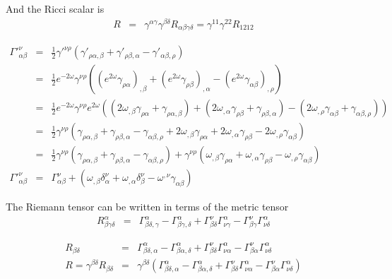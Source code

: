 \documentclass[aps,preprint,preprintnumbers,nofootinbib,showpacs,prd]{revtex4-1}
\newcommand{\nbea}{\begin{eqnarray*}}
\newcommand{\neea}{\end{eqnarray*}}
\begin{document}
And the Ricci scalar is
%
\nbea
R & = & \gamma^{\alpha\gamma} \gamma^{\beta\delta} R_{\alpha\beta\gamma\delta} = \gamma^{11} \gamma^{22} R_{1212}
\neea
%


%
\nbea
\Gamma'^\nu_{\alpha\beta} & = & \frac{1}{2} \gamma'^{\nu\rho} \left ( \gamma'_{\rho\alpha,\beta} + \gamma'_{\rho\beta,\alpha} - \gamma'_{\alpha\beta,\rho} \right ) \\
& = & \frac{1}{2} e^{-2\omega}\gamma^{\nu\rho} \left ( (e^{2\omega}\gamma_{\rho\alpha})_{,\beta} + (e^{2\omega}\gamma_{\rho\beta})_{,\alpha} - (e^{2\omega}\gamma_{\alpha\beta})_{,\rho} \right ) \\
& = & \frac{1}{2} e^{-2\omega}\gamma^{\nu\rho} e^{2\omega} \left ( (2 \omega_{,\beta} \gamma_{\rho\alpha} + \gamma_{\rho\alpha,\beta} ) + (2\omega_{,\alpha}\gamma_{\rho\beta} + \gamma_{\rho\beta,\alpha}) - (2\omega_{,\rho} \gamma_{\alpha\beta} + \gamma_{\alpha\beta,\rho}) \right ) \\
& = & \frac{1}{2} \gamma^{\nu\rho} \left ( \gamma_{\rho\alpha,\beta} + \gamma_{\rho\beta,\alpha} - \gamma_{\alpha\beta,\rho} +  2 \omega_{,\beta} \gamma_{\rho\alpha} + 2\omega_{,\alpha}\gamma_{\rho\beta} - 2\omega_{,\rho} \gamma_{\alpha\beta} \right ) \\
& = & \frac{1}{2} \gamma^{\nu\rho} \left ( \gamma_{\rho\alpha,\beta} + \gamma_{\rho\beta,\alpha} - \gamma_{\alpha\beta,\rho} \right ) + \gamma^{\nu\rho} \left ( \omega_{,\beta} \gamma_{\rho\alpha} + \omega_{,\alpha}\gamma_{\rho\beta} - \omega_{,\rho} \gamma_{\alpha\beta} \right ) \\
\Gamma'^\nu_{\alpha\beta} & = & \Gamma^\nu_{\alpha\beta} + \left ( \omega_{,\beta} \delta^\nu_\alpha + \omega_{,\alpha}\delta^\nu_\beta - \omega^{,\nu} \gamma_{\alpha\beta} \right )
\neea
%

The Riemann tensor can be written in terms of the metric tensor
%
\nbea
R^\alpha_{\beta\gamma\delta} & = &  \Gamma^\alpha_{\beta\delta,\gamma} - \Gamma^\alpha_{\beta\gamma,\delta} + \Gamma^{\nu}_{\beta\delta}\Gamma^{\alpha}_{\nu\gamma} - \Gamma^{\nu}_{\beta\gamma}\Gamma^{\alpha}_{\nu\delta}
\neea
%

%
\nbea
R_{\beta\delta} & = &  \Gamma^\alpha_{\beta\delta,\alpha} - \Gamma^\alpha_{\beta\alpha,\delta} + \Gamma^{\nu}_{\beta\delta}\Gamma^{\alpha}_{\nu\alpha} - \Gamma^{\nu}_{\beta\alpha}\Gamma^{\alpha}_{\nu\delta} \\
R = \gamma^{\beta\delta} R_{\beta\delta} & = & \gamma^{\beta\delta} ( \Gamma^\alpha_{\beta\delta,\alpha} - \Gamma^\alpha_{\beta\alpha,\delta} + \Gamma^{\nu}_{\beta\delta}\Gamma^{\alpha}_{\nu\alpha} - \Gamma^{\nu}_{\beta\alpha}\Gamma^{\alpha}_{\nu\delta} )
\neea
%
\end{document}
